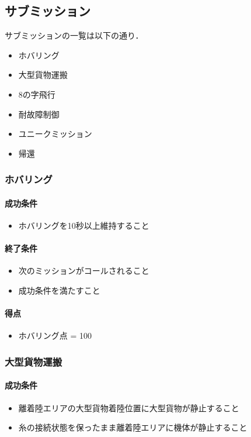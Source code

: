 \subsection{サブミッション}
サブミッションの一覧は以下の通り．
\begin{itemize}
\item ホバリング
\item 大型貨物運搬
\item 8の字飛行
\item 耐故障制御
\item ユニークミッション
\item 帰還
\end{itemize}

\subsubsection{ホバリング}
\paragraph{成功条件}
\begin{itemize}
  \item ホバリングを10秒以上維持すること
\end{itemize}
\paragraph{終了条件}
\begin{itemize}
  \item 次のミッションがコールされること
  \item 成功条件を満たすこと
\end{itemize}
\paragraph{得点}
\begin{itemize}
  \item ホバリング点 = 100
\end{itemize}

\subsubsection{大型貨物運搬}
\paragraph{成功条件}
\begin{itemize}
  \item 離着陸エリアの大型貨物着陸位置に大型貨物が静止すること
  \item 糸の接続状態を保ったまま離着陸エリアに機体が静止すること
\end{itemize}
